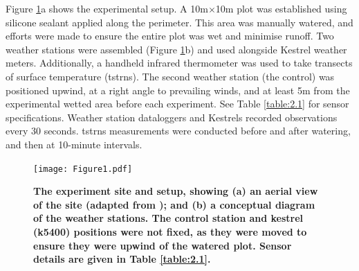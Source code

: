 \documentclass[final,3p,times,authoryear]{elsarticle}
\begin{document}
Figure \ref{fig:2.1}a shows the experimental setup. A 10m$\times$10m plot was established using silicone sealant applied along the perimeter. This area was manually watered, and efforts were made to ensure the entire plot was wet and minimise runoff. Two weather stations were assembled (Figure \ref{fig:2.1}b) and used alongside Kestrel weather meters. Additionally, a handheld infrared thermometer was used to take transects of surface temperature (\gls{tstrns}). The second weather station (the control) was positioned upwind, at a right angle to prevailing winds, and at least 5m from the experimental wetted area before each experiment. See Table \ref{table:2.1} for sensor specifications. Weather station dataloggers and Kestrels recorded observations every 30 seconds. \gls{tstrns} measurements were conducted before and after watering, and then at 10-minute intervals.


\begin{figure}
\centering
\texttt{[image: Figure1.pdf]}
\caption{\bf The experiment site and setup, showing (a) an aerial view of the site (adapted from \cite{Nearmap2022}); and (b) a conceptual diagram of the weather stations. The control station and kestrel (k5400) positions were not fixed, as they were moved to ensure they were upwind of the watered plot. Sensor details are given in Table \ref{table:2.1}.}
 \label{fig:2.1}
\end{figure}
\end{document}
